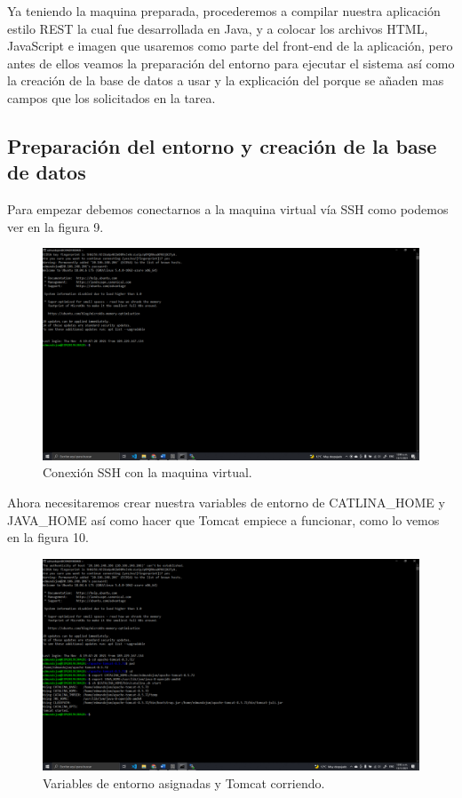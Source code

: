 \documentclass[11pt]{article}
\begin{document}
		Ya teniendo la maquina preparada, procederemos a compilar nuestra aplicación estilo REST la cual fue desarrollada en Java, y a colocar los archivos HTML, JavaScript e imagen que usaremos como parte del front-end de la aplicación, pero antes de ellos veamos la preparación del entorno para ejecutar el sistema así como la creación de la base de datos a usar y la explicación del porque se añaden mas campos que los solicitados en la tarea.
		\subsection{Preparación del entorno y creación de la base de datos}		
	Para empezar debemos conectarnos a la maquina virtual vía SSH como podemos ver en la figura 9.
	\begin{figure}[H]
			\centering
			\includegraphics[scale=0.34]{resources/conexionssh.png}
			\caption{Conexión SSH con la maquina virtual.}\label{fig:picture}
		\end{figure}
		Ahora necesitaremos crear nuestra variables de entorno de CATLINA\_HOME y JAVA\_HOME así como hacer que Tomcat empiece a funcionar, como lo vemos en la figura 10.
		\begin{figure}[H]
			\centering
			\includegraphics[scale=0.34]{resources/tomcat_variables_entorno.png}
			\caption{Variables de entorno asignadas y Tomcat corriendo.}\label{fig:picture}
		\end{figure}
\end{document}
